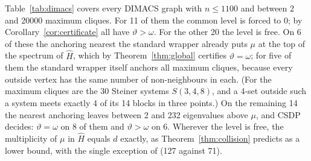 \documentclass[11pt]{article}
\theoremstyle{definition}
\theoremstyle{remark}
\newcommand{\hH}{\hat{H}}
\newcommand{\gr}[1]{\texttt{\detokenize{#1}}}
\begin{document}
Table~\ref{tab:dimacs} covers every DIMACS graph with $n\leq1100$ and
between 2 and 20000 maximum cliques. For 11 of them the common level is
forced to $0$; by Corollary~\ref{cor:certificate} all have $\vartheta>
\omega$. For the other 20 the level is free. On 6 of these the anchoring
nearest the standard wrapper already puts $\mu$ at the top of the spectrum
of $\hH$, which by Theorem~\ref{thm:global} certifies $\vartheta=\omega$;
for five of them the standard wrapper itself anchors all maximum cliques,
because every outside vertex has the same number of non-neighbours in each.
(For \gr{johnson8-4-4} the maximum cliques are the 30 Steiner systems
$S(3,4,8)$, and a 4-set outside such a system meets exactly 4 of its 14
blocks in three points.) On the remaining 14 the nearest anchoring leaves
between 2 and 232 eigenvalues above $\mu$, and CSDP decides:
$\vartheta=\omega$ on 8 of them and $\vartheta>\omega$ on 6. Wherever the
level is free, the multiplicity of $\mu$ in $\hH$ equals $d$ exactly, as
Theorem~\ref{thm:collision} predicts as a lower bound, with the single
exception of \gr{hamming8-4} (127 against 71).
\end{document}
